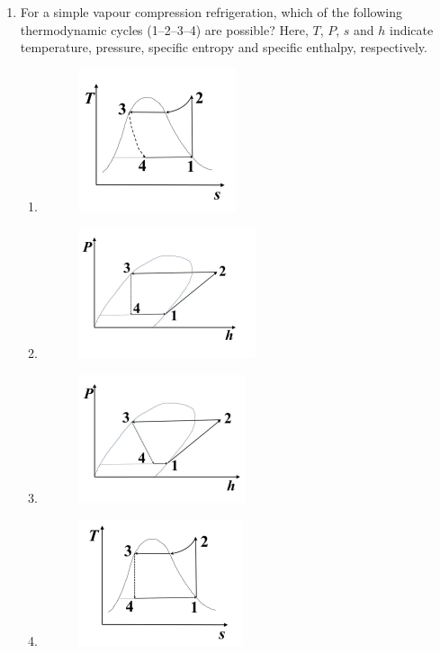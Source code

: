 \documentclass[journal,12pt,onecolumn]{IEEEtran}
\theoremstyle{remark}
\begin{document}
\begin{enumerate}
\item  For a simple vapour compression refrigeration, which of the following thermodynamic cycles (1--2--3--4) are possible?  
Here, $T$, $P$, $s$ and $h$ indicate temperature, pressure, specific entropy and specific enthalpy, respectively.
\newpage
\begin{enumerate}
	\item \begin{figure}[h]
		\centering
		\includegraphics[width=0.2\columnwidth]{fig8}
                \caption{}
                \label{fig:placeholder}
                \end{figure}
	\item \begin{figure}[h]
		\centering
		\includegraphics[width=0.2\columnwidth]{fig9}
		\caption{}
		\label{fig:placeholder}
	      \end{figure}
       \item  \begin{figure}[h]
		\centering
		\includegraphics[width=0.2\columnwidth]{fig10}
		\caption{}
		\label{fig:placeholder}
                 \end{figure}
		\item \begin{figure}[h]
			\centering
			\includegraphics[width=0.2\columnwidth]{fig11}
			\caption{}
			\label{fig:placeholder}
		        \end{figure}
\end{enumerate}


\end{enumerate}
\end{document}
